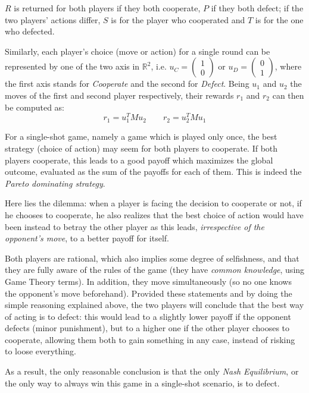 \documentclass[journal,10pt,twoside]{IEEEtran}
\begin{document}
$R$ is returned for both players if they both cooperate, $P$ if they both defect; if the two players' actions differ, $S$ is for the player who cooperated and $T$ is for the one who defected.

Similarly, each player's choice (move or action) for a single round can be represented by one of the two axis in $\mathbb{R}^2$, i.e. $u_C=\begin{pmatrix} 1 \\ 0 \end{pmatrix}$ or $u_D=\begin{pmatrix} 0 \\ 1 \end{pmatrix}$, where the first axis stands for \textit{Cooperate} and the second for \textit{Defect}. Being $u_1$ and $u_2$ the moves of the first and second player respectively, their rewards $r_1$ and $r_2$ can then be computed as:
$$
r_1 = u_1^T M u_2
\quad
\quad
r_2 = u_2^T M u_1
$$

For a single-shot game, namely a game which is played only once, the best strategy (choice of action) may seem for both players to cooperate. If both players cooperate, this leads to a good payoff which maximizes the global outcome, evaluated as the sum of the payoffs for each of them. This is indeed the \textit{Pareto dominating strategy}.

Here lies the dilemma: when a player is facing the decision to cooperate or not, if he chooses to cooperate, he also realizes that the best choice of action would have been instead to betray the other player as this leads, \textit{irrespective of the opponent's move}, to a better payoff for itself.

Both players are rational, which also implies some degree of selfishness, and that they are fully aware of the rules of the game (they have \textit{common knowledge}, using Game Theory terms). In addition, they move simultaneously (so no one knows the opponent's move beforehand). Provided these statements and by doing the simple reasoning explained above, the two players will conclude that the best way of acting is to defect: this would lead to a slightly lower payoff if the opponent defects (minor punishment), but to a higher one if the other player chooses to cooperate, allowing them both to gain something in any case, instead of risking to loose everything.

As a result, the only reasonable conclusion is that the only \textit{Nash Equilibrium}, or the only way to always win this game in a single-shot scenario, is to defect.
\end{document}
